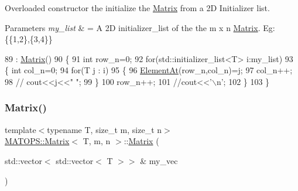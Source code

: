 Overloaded constructor the initialize the \hyperlink{classMATOPS_1_1Matrix}{Matrix} from a 2D Initializer list. 


\begin{DoxyParams}{Parameters}
{\em my\+\_\+list} & = A 2D initializer\+\_\+list of the the m x n \hyperlink{classMATOPS_1_1Matrix}{Matrix}. Eg\+: \{\{1,2\},\{3,4\}\} \\
\hline
\end{DoxyParams}

\begin{DoxyCode}
89                                                                                    :
      \hyperlink{classMATOPS_1_1Matrix_ab714719c18d79c8d0480d0665ff56609}{Matrix}()
90                                 \{
91                                         \textcolor{keywordtype}{int} row\_n=0;
92                                         \textcolor{keywordflow}{for}(std::initializer\_list<T> i:my\_list)
93                                         \{   \textcolor{keywordtype}{int} col\_n=0;
94                                                 \textcolor{keywordflow}{for}(T j : i)
95                                                 \{
96                                                         \hyperlink{classMATOPS_1_1Matrix_a9eabd6b452bd01040c9ecaadc2ad6562}{ElementAt}(row\_n,col\_n)=j;
97                                                         col\_n++;
98                                                         \textcolor{comment}{// cout<<j<<" ";}
99                                                 \}
100                                                 row\_n++;
101                                                 \textcolor{comment}{//cout<<'\(\backslash\)n';}
102                                         \}
103                                 \}
\end{DoxyCode}
\mbox{\label{classMATOPS_1_1Matrix_a6daf4c8232f2e9b0b1297a6e08eb4f1c}} 
\subsubsection{\texorpdfstring{Matrix()}{Matrix()}\hspace{0.1cm}{\footnotesize\ttfamily [3/3]}}
{\footnotesize\ttfamily template$<$typename T, size\+\_\+t m, size\+\_\+t n$>$ \\
\hyperlink{classMATOPS_1_1Matrix}{M\+A\+T\+O\+P\+S\+::\+Matrix}$<$ T, m, n $>$\+::\hyperlink{classMATOPS_1_1Matrix}{Matrix} (\begin{DoxyParamCaption}\item[{std\+::vector$<$ std\+::vector$<$ T $>$$>$ \&}]{my\+\_\+vec }\end{DoxyParamCaption})\hspace{0.3cm}{\ttfamily [inline]}}



